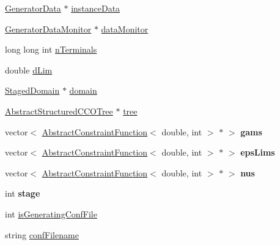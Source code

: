\begin{DoxyCompactItemize}
\item 
\hyperlink{class_generator_data}{Generator\+Data} $\ast$ \hyperlink{class_staged_fixed_perfusion_radius_tree_generator_a1b8f6b967274fe549955c6066f8836cc}{instance\+Data}
\item 
\hyperlink{class_generator_data_monitor}{Generator\+Data\+Monitor} $\ast$ \hyperlink{class_staged_fixed_perfusion_radius_tree_generator_ae1da125a5fc18e0622ed84ab1bb14c4d}{data\+Monitor}
\item 
long long int \hyperlink{class_staged_fixed_perfusion_radius_tree_generator_a2ae587dc32819ae4384fd095bc236511}{n\+Terminals}
\item 
double \hyperlink{class_staged_fixed_perfusion_radius_tree_generator_a24a92e7229dd55f85b14c6fa1a2fd648}{d\+Lim}
\item 
\hyperlink{class_staged_domain}{Staged\+Domain} $\ast$ \hyperlink{class_staged_fixed_perfusion_radius_tree_generator_a181b53d6b220d1b589f486c0a88d5c97}{domain}
\item 
\hyperlink{class_abstract_structured_c_c_o_tree}{Abstract\+Structured\+C\+C\+O\+Tree} $\ast$ \hyperlink{class_staged_fixed_perfusion_radius_tree_generator_ae07119a1095859cc74c7144ea0b87040}{tree}
\item 
vector$<$ \hyperlink{class_abstract_constraint_function}{Abstract\+Constraint\+Function}$<$ double, int $>$ $\ast$ $>$ {\bfseries gams}\hypertarget{class_staged_fixed_perfusion_radius_tree_generator_af6bb97cc854924f8df62faff70f1d015}{}\label{class_staged_fixed_perfusion_radius_tree_generator_af6bb97cc854924f8df62faff70f1d015}

\item 
vector$<$ \hyperlink{class_abstract_constraint_function}{Abstract\+Constraint\+Function}$<$ double, int $>$ $\ast$ $>$ {\bfseries eps\+Lims}\hypertarget{class_staged_fixed_perfusion_radius_tree_generator_a7a47d720671ae5b71d56ba8c5037a834}{}\label{class_staged_fixed_perfusion_radius_tree_generator_a7a47d720671ae5b71d56ba8c5037a834}

\item 
vector$<$ \hyperlink{class_abstract_constraint_function}{Abstract\+Constraint\+Function}$<$ double, int $>$ $\ast$ $>$ {\bfseries nus}\hypertarget{class_staged_fixed_perfusion_radius_tree_generator_aea533946c236a58fc9e850d268de6a0d}{}\label{class_staged_fixed_perfusion_radius_tree_generator_aea533946c236a58fc9e850d268de6a0d}

\item 
int {\bfseries stage}\hypertarget{class_staged_fixed_perfusion_radius_tree_generator_aa24f651f0a986011a43b6fe50eb334b5}{}\label{class_staged_fixed_perfusion_radius_tree_generator_aa24f651f0a986011a43b6fe50eb334b5}

\item 
int \hyperlink{class_staged_fixed_perfusion_radius_tree_generator_aeb2b61eca4e60b31209eb87730153db7}{is\+Generating\+Conf\+File}
\item 
string \hyperlink{class_staged_fixed_perfusion_radius_tree_generator_ab8dbc505effc0a2daf797f03741a8238}{conf\+Filename}
\end{DoxyCompactItemize}


